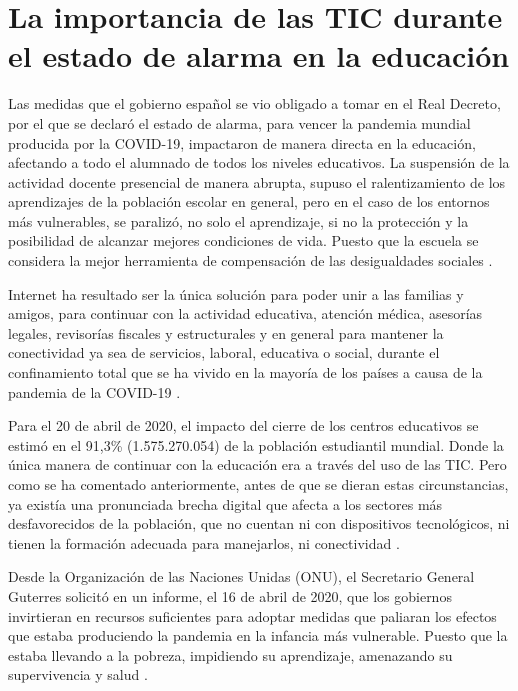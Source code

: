 \documentclass{textolivre}
\begin{document}
\section{La importancia de las TIC durante el estado de alarma en la educación}
Las medidas que el gobierno español se vio obligado a tomar en el Real Decreto, por el que se declaró el estado de alarma, para vencer la pandemia mundial producida por la COVID-19, impactaron de manera directa en la educación, afectando a todo el alumnado de todos los niveles educativos. La suspensión de la actividad docente presencial de manera abrupta, supuso el ralentizamiento de los aprendizajes de la población escolar en general, pero en el caso de los entornos más vulnerables, se paralizó, no solo el aprendizaje, si no la protección y la posibilidad de alcanzar mejores condiciones de vida. Puesto que la escuela se considera la mejor herramienta de compensación de las desigualdades sociales \cite{espinosa2020}.

Internet ha resultado ser la única solución para poder unir a las familias y amigos, para continuar con la actividad educativa, atención médica, asesorías legales, revisorías fiscales y estructurales y en general para mantener la conectividad ya sea de servicios, laboral, educativa o social, durante el confinamiento total que se ha vivido en la mayoría de los países a causa de la pandemia de la COVID-19 \cite{lopezdaza2020}.

Para el 20 de abril de 2020, el impacto del cierre de los centros educativos se estimó en el 91,3\% (1.575.270.054) de la población estudiantil mundial. Donde la única manera de continuar con la educación era a través del uso de las TIC. Pero como se ha comentado anteriormente, antes de que se dieran estas circunstancias, ya existía una pronunciada brecha digital que afecta a los sectores más desfavorecidos de la población, que no cuentan ni con dispositivos tecnológicos, ni tienen la formación adecuada para manejarlos, ni conectividad \cite{lopezdaza2020}.

Desde la Organización de las Naciones Unidas (ONU), el Secretario General Guterres solicitó en un informe, el 16 de abril de 2020, que los gobiernos invirtieran en recursos suficientes para adoptar medidas que paliaran los efectos que estaba produciendo la pandemia en la infancia más vulnerable. Puesto que la estaba llevando a la pobreza, impidiendo su aprendizaje, amenazando su supervivencia y salud \cite{onu2020}.
\end{document}

